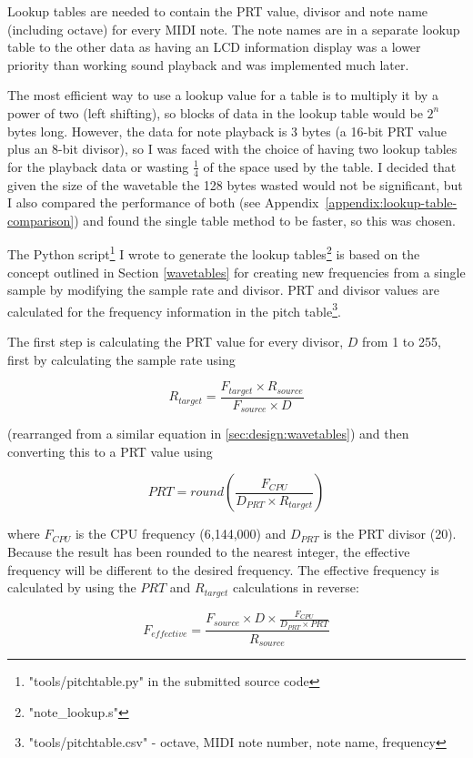 Lookup tables are needed to contain the PRT value, divisor and note name (including octave) for 
every MIDI note.  The note names are in a separate lookup table to the other data as having an LCD 
information display was a lower priority than working sound playback and was implemented much later.

The most efficient way to use a lookup value for a table is to multiply it by a power of two (left 
shifting), so blocks of data in the lookup table would be $2^n$ bytes long.  However, the data for 
note playback is 3 bytes (a 16-bit PRT value plus an 8-bit divisor), so I was faced with the choice 
of having two lookup tables for the playback data or wasting $\frac{1}{4}$ of the space used by the 
table.  I decided that given the size of the wavetable the 128 bytes wasted would not be 
significant, but I also compared the performance of both (see 
Appendix~\ref{appendix:lookup-table-comparison}) and found the single table method to be faster, so 
this was chosen.

The Python script\footnote{"tools/pitchtable.py" in the submitted source code} I wrote to generate 
the lookup tables\footnote{"note\_lookup.s"} is based on the concept outlined in Section 
\ref{wavetables} for creating new frequencies from a single sample by modifying the sample rate and 
divisor.  PRT and divisor values are calculated for the frequency information in the pitch 
table\footnote{"tools/pitchtable.csv" - octave, MIDI note number, note name, frequency}.

The first step is calculating the PRT value for every divisor, $D$ from 1 to 255, first by 
calculating the sample rate using

\[R_{target} = \frac{F_{target} \times R_{source}}{F_{source} \times D}\]

(rearranged from a similar equation in \ref{sec:design:wavetables}) and then converting this to a 
PRT value using

\[PRT = round\left(\frac{F_{CPU}}{D_{PRT}\times{}R_{target}}\right)\]

where $F_{CPU}$ is the CPU frequency (6,144,000) and $D_{PRT}$ is the PRT divisor (20).  Because the 
result has been rounded to the nearest integer, the effective frequency will be different to the 
desired frequency.  The effective frequency is calculated by using the $PRT$ and $R_{target}$ 
calculations in reverse:

\[F_{effective} = \frac{F_{source}\times{}D\times{}\frac{F_{CPU}}{D_{PRT}\times{}PRT}}{R_{source}}\]

